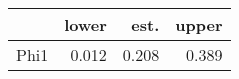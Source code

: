 \begin{table}[ht]
\centering
\begin{tabular}{rrrr}
  \hline
 & lower & est. & upper \\ 
  \hline
Phi1 & 0.012 & 0.208 & 0.389 \\ 
   \hline
\end{tabular}
\end{table}
